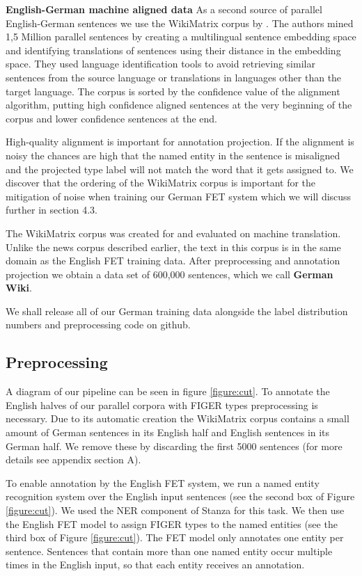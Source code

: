 \documentclass[11pt,a4paper]{article}
\begin{document}
\textbf{English-German machine aligned data} As a second source of parallel English-German sentences we use the WikiMatrix corpus by \citet{schwenk2019wikimatrix}. The authors mined 1,5 Million parallel sentences by creating a multilingual sentence embedding space and identifying translations of sentences using their distance in the embedding space. They used language identification tools to avoid retrieving similar sentences from the source language or translations in languages other than the target language. The corpus is sorted by the confidence value of the alignment algorithm, putting high confidence aligned sentences at the very beginning of the corpus and lower confidence sentences at the end. 

High-quality alignment is important for annotation projection. If the alignment is noisy the chances are high that the named entity in the sentence is misaligned and the projected type label will not match the word that it gets assigned to. We discover that the ordering of the WikiMatrix corpus is important for the mitigation of noise when training our German FET system which we will discuss further in section 4.3.

The WikiMatrix corpus was created for and evaluated on machine translation. Unlike the news corpus described earlier, the text in this corpus is in the same domain as the English FET training data. After preprocessing and annotation projection we obtain a data set of 600,000 sentences, which we call \textbf{German Wiki}.

We shall release all of our German training data alongside the label distribution numbers and preprocessing code on github.



\subsection{Preprocessing}
A diagram of our pipeline can be seen in figure \ref{figure:cut}. To annotate the English halves of our parallel corpora with FIGER types preprocessing is necessary. Due to its automatic creation the WikiMatrix corpus contains a small amount of German sentences in its English half and English sentences in its German half. We remove these by discarding the first 5000 sentences (for more details see appendix section A). 

To enable annotation by the English FET system, we run a named entity recognition system over the English input sentences (see the second box of Figure \ref{figure:cut}). We used the NER component of Stanza \cite{qi2020stanza} for this task. We then use the English FET model to assign FIGER types to the named entities (see the third box of Figure \ref{figure:cut}). The FET model only annotates one entity per sentence. Sentences that contain more than one named entity occur multiple times in the English input, so that each entity receives an annotation.
\end{document}

